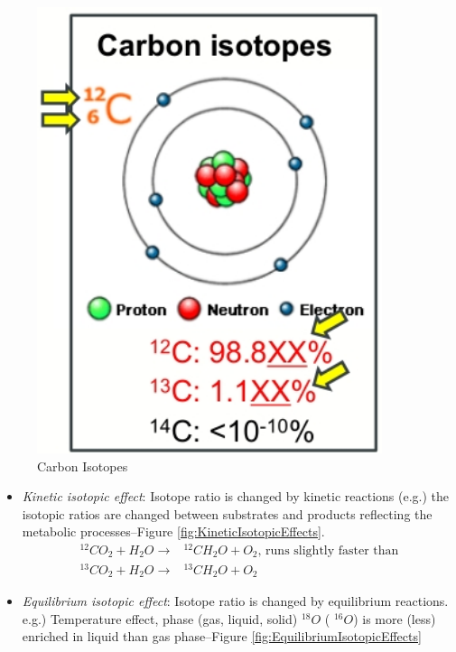 \documentclass[]{article}
\begin{document}
\begin{figure}[H]
	\caption{Carbon Isotopes}\label{fig:CarbonIsotopes}
	\includegraphics[width=0.9\textwidth]{CarbonIsotopes}
\end{figure}


\begin{itemize}
	\item \textit{Kinetic isotopic effect}:
	Isotope ratio is changed by kinetic reactions 	(e.g.) the isotopic ratios are changed between substrates and products reflecting the metabolic processes--Figure \ref{fig:KineticIsotopicEffects}. \begin{align*}
	^{12}CO_2 + H_2O \rightarrow&^{12}CH_2O + O_2 \text{, runs slightly faster than}\\
	^{13}CO_2 + H_2O \rightarrow&^{13}CH_2O + O_2 
	\end{align*}
	\item \textit{Equilibrium isotopic effect}:
	Isotope ratio is changed by equilibrium reactions.
	e.g.) Temperature effect, phase (gas, liquid, solid)
	$^{18}O$ ( $^{16}O$) is more (less) enriched in liquid than gas phase--Figure \ref{fig:EquilibriumIsotopicEffects}
\end{itemize}
\end{document}
